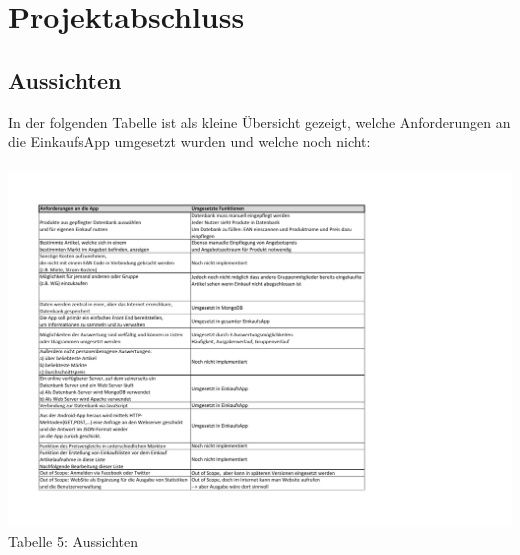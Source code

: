 \documentclass[12pt,a4paper]{article}
\begin{document}
\section{Projektabschluss}
\subsection{Aussichten}
In der folgenden Tabelle ist als kleine Übersicht gezeigt, welche Anforderungen an die EinkaufsApp umgesetzt wurden und welche noch nicht: 
\\
\\
\hspace*{-10mm} 
\includegraphics[trim = 17mm 10mm 0mm 20mm,clip,scale=0.9]{Anforderungen-Probleme.pdf}
\\
\footnotesize Tabelle 5: Aussichten
\normalsize
\newpage
\end{document}
